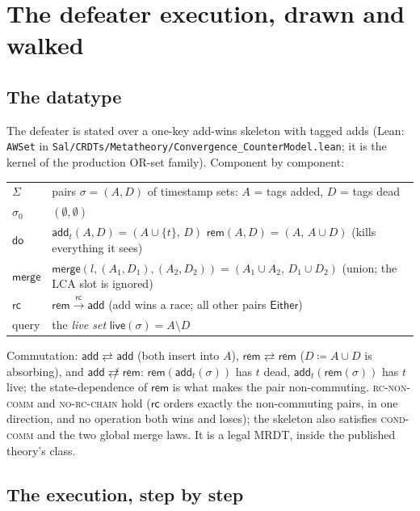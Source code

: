 \documentclass[11pt]{article}
\newcommand{\rc}{\xrightarrow{\mathsf{rc}}}
\newcommand{\rcrel}{\mathsf{rc}}
\newcommand{\comm}{\rightleftarrows}
\newcommand{\ncomm}{\not\rightleftarrows}
\newcommand{\add}{\mathsf{add}}
\newcommand{\rem}{\mathsf{rem}}
\newcommand{\mergeL}{\mathsf{merge}}
\newcommand{\Sinit}{\sigma_0}
\newcommand{\lean}[1]{\texttt{#1}}
\newcommand{\live}{\mathsf{live}}
\begin{document}
\section{The defeater execution, drawn and walked}
\label{sec:walk}

\subsection{The datatype}

The defeater is stated over a one-key add-wins skeleton with tagged
adds (Lean: \lean{AWSet} in
\lean{Sal/CRDTs/Metatheory/Convergence\_CounterModel.lean}; it is the
kernel of the production OR-set family). Component by component:

\begin{center}
\small
\begin{tabular}{@{}ll@{}}
\toprule
$\Sigma$ & pairs $\sigma = (A, D)$ of timestamp sets: $A$ = tags added,
$D$ = tags dead \\
$\Sinit$ & $(\emptyset, \emptyset)$ \\
$\mathsf{do}$ & $\add_t(A, D) = (A \cup \{t\},\, D)$ \qquad
$\rem(A, D) = (A,\, A \cup D)$ \quad (kills everything it sees) \\
$\mergeL$ & $\mergeL(l, (A_1,D_1), (A_2,D_2)) =
(A_1 \cup A_2,\, D_1 \cup D_2)$ \quad (union; the LCA slot is
ignored) \\
$\rcrel$ & $\rem \rc \add$ (add wins a race; all other pairs
$\mathsf{Either}$) \\
query & the \emph{live set} $\live(\sigma) = A \setminus D$ \\
\bottomrule
\end{tabular}
\end{center}

Commutation: $\add \comm \add$ (both insert into $A$),
$\rem \comm \rem$ ($D \coloneqq A \cup D$ is absorbing), and
$\add \ncomm \rem$: $\rem(\add_t(\sigma))$ has $t$ dead,
$\add_t(\rem(\sigma))$ has $t$ live; the state-dependence of $\rem$ is
what makes the pair non-commuting. \textsc{rc-non-comm} and
\textsc{no-rc-chain} hold ($\rcrel$ orders exactly the non-commuting
pairs, in one direction, and no operation both wins and loses); the
skeleton also satisfies \textsc{cond-comm} and the two global merge
laws. It is a legal MRDT, inside the published theory's class.

\subsection{The execution, step by step}
\end{document}
